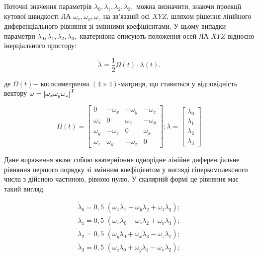 Поточні значення параметрів $\lambda_{0} ,\lambda_{1} ,\lambda_{2} ,\lambda_{3} 
,$ можна визначити, знаючи проекції кутової швидкості ЛА $\omega_{x} ,\omega_{y} 
,\omega_{z} $ на зв'язаній осі $XYZ$, шляхом рішення лінійного диференціального 
рівняння зі змінними коефіцієнтами. У цьому випадки параметри $\lambda_{0} ,\lambda 
_{1} ,\lambda_{2} ,\lambda_{3} ,$ кватерніона описують положення осей ЛА $XYZ$ відносно 
інерціального простору:

\[\dot{\lambda }=\frac{1}{2} \Omega \left(t\right)\cdot \lambda \left(t\right).\] 

де $\Omega 
\left(t\right)$$-$ кососиметрична $\left(4\times 4\right)$-матриця, що ставиться 
у відповідність вектору $\omega =\left[\omega_{x} \omega_{y} \omega_{z} \right]^{{
\rm T} } $

\[\Omega \left(t\right)=\left[\begin{array}{cccc} {0} & {-\omega_{x} } & {-\omega 
_{y} } & {-\omega_{z} } \\ {\omega_{x} } & {0} & {\omega_{z} } & {-\omega_{y} 
} \\ {\omega_{y} } & {-\omega_{z} } & {0} & {\omega_{x} } \\ {\omega_{z} } & 
{\omega_{y} } & {-\omega_{x} } & {0} \end{array}\right];\lambda =\left[\begin{array}{c} 
{\lambda_{0} } \\ {\lambda_{1} } \\ {\lambda_{2} } \\ {\lambda_{3} } \end{array}
\right]\] 

Дане вираження  являє собою кватерніонне однорідне лінійне диференціальне рівняння 
першого порядку зі змінним коефіцієнтом у вигляді гіперкомплексного числа з дійсною 
частиною, рівною нулю. У скалярній формі це рівняння  має такий вигляд

\[\begin{array}{l} {\dot{\lambda }_{0} =0,5\, \, \left(\omega_{x} \lambda_{1} +
\omega_{y} \lambda_{2} +\omega_{z} \lambda_{3} \right);} \\ {\dot{\lambda }_{1} 
=0,5\, \, \left(\omega_{x} \lambda_{0} +\omega_{z} \lambda_{2} +\omega_{y} \lambda 
_{3} \right);} \\ {\dot{\lambda }_{2} =0,5\, \, \left(\omega_{y} \lambda_{0} +
\omega_{x} \lambda_{3} -\omega_{z} \lambda_{1} \right);} \\ {\dot{\lambda }_{3} 
=0,5\, \, \left(\omega_{z} \lambda_{0} +\omega_{y} \lambda_{1} -\omega_{x} \lambda 
_{2} \right);} \end{array}\] 

